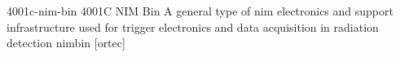 \newglsXequipment%
{4001c-nim-bin}%
{4001C NIM Bin}%
{A general type of \gls{nim} electronics and support infrastructure used for trigger electronics and data acquisition in radiation detection}%
{nimbin}%
[ortec]%